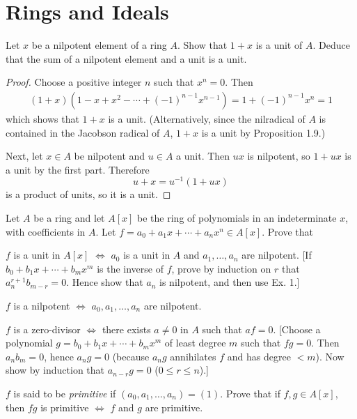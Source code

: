 \chapter{Rings and Ideals}
\label{ch:1}

\begin{exercise}
\label{ex:1.1}
Let $x$ be a nilpotent element of a ring $A$.
Show that $1 + x$ is a unit of $A$.
Deduce that the sum of a nilpotent element and a unit is a unit.
\end{exercise}

\begin{proof}
Choose a positive integer $n$ such that $x^n = 0$.
Then
\begin{align*}
(1 + x) (1 - x + x^2 - \cdots + (-1)^{n-1} x^{n-1})
= 1 + (-1)^{n-1}x^n
= 1
\end{align*}
which shows that $1 + x$ is a unit.
(Alternatively, since the nilradical of $A$ is contained in the Jacobson radical of $A$, $1 + x$ is a unit by Proposition 1.9.)

Next, let $x\in A$ be nilpotent and $u\in A$ a unit.
Then $ux$ is nilpotent, so $1 + ux$ is a unit by the first part.
Therefore
\begin{equation*}
u + x = u^{-1}(1 + ux)
\end{equation*}
is a product of units, so it is a unit.
\end{proof}




\begin{exercise}
\label{ex:1.2}
Let $A$ be a ring and let $A[x]$ be the ring of polynomials in an indeterminate $x$, with coefficients in $A$.
Let $f = a_0 + a_1 x + \cdots + a_n x^n \in A[x]$.
Prove that
\begin{rlist}
\item
\label{ex:1.2.i}
$f$ is a unit in $A[x]$ $\iff$ $a_0$ is a unit in $A$ and $a_1,\ldots,a_n$ are nilpotent.
[If $b_0+b_1 x + \cdots + b_m x^m$ is the inverse of $f$, prove by induction on $r$ that $a_n^{r+1} b_{m-r} = 0$.
Hence show that $a_n$ is nilpotent, and then use Ex. 1.]
\item
\label{ex:1.2.ii}
$f$ is a nilpotent $\iff$ $a_0,a_1,\ldots,a_n$ are nilpotent.
\item
\label{ex:1.2.iii}
$f$ is a zero-divisor $\iff$ there exists $a \neq 0$ in $A$ such that $a f = 0$.
[Choose a polynomial $g = b_0 + b_1 x + \cdots + b_m x^m$ of least degree $m$ such that $f g = 0$.
Then $a_n b_m = 0$, hence $a_n g = 0$ (because $a_n g$ annihilates $f$ and has degree $< m$).
Now show by induction that $a_{n-r} g = 0$ ($0 \leq r \leq n$).]
\item
\label{ex:1.2.iv}
$f$ is said to be \emph{primitive} if $(a_0,a_1,\ldots,a_n)=(1)$.
Prove that if $f,g\in A[x]$, then $fg$ is primitive $\iff$ $f$ and $g$ are primitive.
\end{rlist}
\end{exercise}


